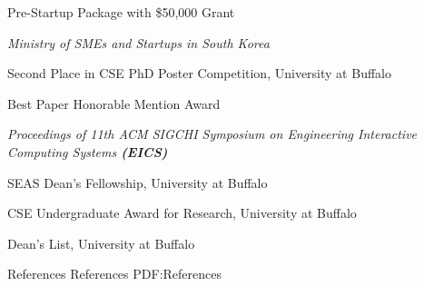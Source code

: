 \documentclass[letterpaper,MMMyyyy,nonstopmode]{simpleresumecv}
\begin{document}
\begin{Body}
\BulletItem
Pre-Startup Package with \$50,000 Grant 
\hfill
{}
\begin{Detail}
\Item
\textit{Ministry of SMEs and Startups in South Korea}
\end{Detail}
\vspace{0.5ex}

\BulletItem
Second Place in CSE PhD Poster Competition, University at Buffalo
\hfill
{}

\vspace{0.5ex}


\BulletItem
Best Paper Honorable Mention Award
\hfill
{}
\begin{Detail}
\Item
\textit{Proceedings of 11th ACM SIGCHI Symposium on Engineering Interactive Computing Systems \textbf{(EICS)}}
\end{Detail}
\vspace{0.5ex}

\Gap
\BulletItem
SEAS Dean’s Fellowship, University at Buffalo
\hfill
{}

\vspace{0.5ex}

\Gap
\BulletItem
CSE Undergraduate Award for Research, University at Buffalo
\hfill
{}

\vspace{0.5ex}

\Gap
\BulletItem
Dean's List, University at Buffalo
\hfill
{}







\vspace{5ex}
\Section
{References}
{References}
{PDF:References}


\end{Body}
\end{document}
